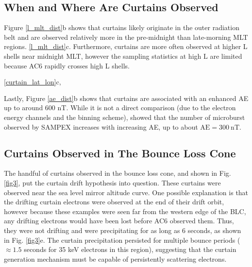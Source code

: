 \documentclass[draft]{agujournal2019}
\begin{document}
\subsection{When and Where Are Curtains Observed}
Figure \ref{l_mlt_dist}b shows that curtains likely originate in the outer radiation belt  and are observed relatively more in the pre-midnight than late-morning MLT regions.  \ref{l_mlt_dist}c. Furthermore, curtains are more often observed at higher L shells near midnight MLT, however the sampling statistics at high L are limited because AC6 rapidly crosses high L shells.  

 \ref{curtain_lat_lon}c, 

Lastly, Figure \ref{ae_dist}b shows that curtains are associated with an enhanced AE up to around 600 nT. While it is not a direct comparison (due to the electron energy channels and the binning scheme),  showed that the number of microburst observed by SAMPEX increases with increasing AE, up to about $\mathrm{AE} = 300 \ \mathrm{nT}$.
 
\subsection{Curtains Observed in The Bounce Loss Cone}
The handful of curtains observed in the bounce loss cone, and shown in Fig. \ref{fig3}, put the  curtain drift hypothesis into question. These curtains were observed near the sea level mirror altitude curve. One possible explanation is that the drifting curtain electrons were observed at the end of their drift orbit, however because these examples were seen far from the western edge of the BLC, any drifting electrons would have been lost before AC6 observed them. Thus, they were not drifting and were precipitating for as long as 6 seconds, as shown in Fig. \ref{fig3}e. The curtain precipitation persisted for multiple bounce periods ($\approx 1.5$ seconds for 35 keV electrons in this region), suggesting that the curtain generation mechanism must be capable of persistently scattering electrons. 
\end{document}
